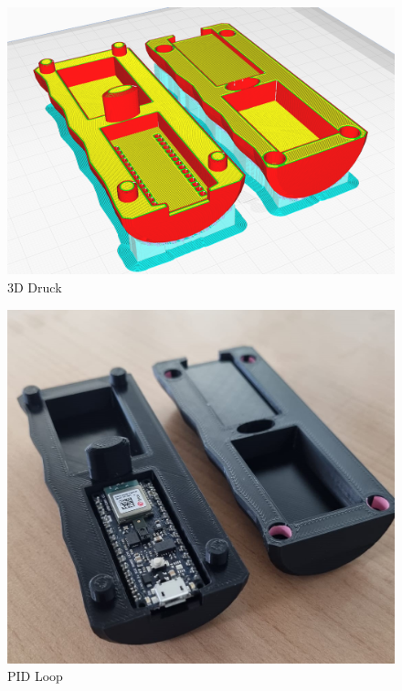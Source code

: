 \begin{figure}[H]
    \begin{center}
      \includegraphics[width=0.8\linewidth]{content/images/Joystick_3D-Print_Slicer.png}
      \caption{3D Druck}
    \end{center}
  \end{figure}

  \begin{figure}[H]
    \begin{center}
      \includegraphics[width=1\linewidth]{content/images/3DPrint_open.jpeg}
      \caption{PID Loop}
    \end{center}
  \end{figure}

